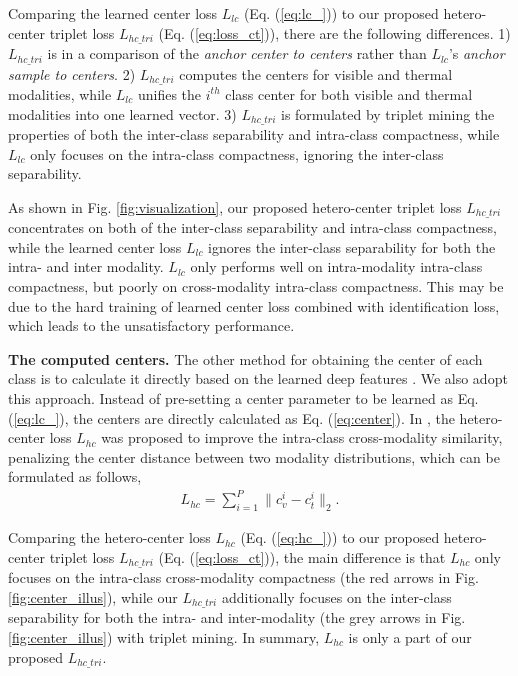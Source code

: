 \documentclass[journal]{IEEEtran}
\begin{document}
Comparing the learned center loss $L_{lc}$ (Eq. (\ref{eq:lc_})) to our proposed hetero-center triplet loss $L_{hc\_tri}$ (Eq. (\ref{eq:loss_ct})), there are the following differences.
1) $L_{hc\_tri}$ is in a comparison of the \emph{anchor center to centers} rather than $L_{lc}$'s \emph{anchor sample to centers}.
2) $L_{hc\_tri}$ computes the centers for visible and thermal modalities, while $L_{lc}$ unifies the $i^{th}$ class center for both visible and thermal modalities into one learned vector.
3) $L_{hc\_tri}$ is formulated by triplet mining the properties of both the inter-class separability and intra-class compactness, while $L_{lc}$ only focuses on the intra-class compactness, ignoring the inter-class separability.

As shown in Fig. \ref{fig:visualization}, our proposed hetero-center triplet loss $L_{hc\_tri}$ concentrates on both of the inter-class separability and intra-class compactness, while the learned center loss $L_{lc}$ ignores the inter-class separability for both the intra- and inter modality.
$L_{lc}$ only performs well on intra-modality intra-class compactness, but poorly on cross-modality intra-class compactness. This may be due to the hard training of learned center loss combined with identification loss, which leads to the unsatisfactory performance.

\textbf{The computed centers.} The other method for obtaining the center of each class is to calculate it directly based on the learned deep features \cite{zhu2019hetero}. We also adopt this approach. Instead of pre-setting a center parameter to be learned as Eq. (\ref{eq:lc_}), the centers are directly calculated as Eq. (\ref{eq:center}).
In \cite{zhu2019hetero}, the hetero-center loss $L_{hc}$ was proposed to improve the intra-class cross-modality similarity, penalizing the center distance between two modality distributions, which can be formulated as follows,
\begin{align} \label{eq:hc_}
    L_{hc} =  \sum_{i=1}^{P} \| c^{i}_{v} - c^{i}_{t} \|_{2}.
\end{align}

Comparing the hetero-center loss $L_{hc}$ (Eq. (\ref{eq:hc_})) to our proposed hetero-center triplet loss $L_{hc\_tri}$ (Eq. (\ref{eq:loss_ct})), the main difference is that $L_{hc}$ only focuses on the intra-class cross-modality compactness (the red arrows in Fig. \ref{fig:center_illus}), while our $L_{hc\_tri}$ additionally focuses on the inter-class separability for both the intra- and inter-modality (the grey arrows in Fig. \ref{fig:center_illus}) with triplet mining. In summary, $L_{hc}$ is only a part of our proposed $L_{hc\_tri}$.
\end{document}
